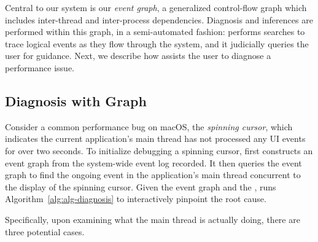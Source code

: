 Central to our system is our \emph{event graph}, a generalized control-flow
graph which includes inter-thread and inter-process dependencies. Diagnosis
and inferences are performed within this graph, in a semi-automated fashion:
\xxx performs searches to trace logical events as they
flow through the system, and it judicially queries the user for guidance.
Next, we describe how \xxx assists the user to diagnose a performance issue.


\subsection{Diagnosis with Graph}\label{subsec:debug}



Consider a common performance bug on macOS, the \emph{spinning cursor},
which indicates the current application's main thread has not processed
any UI events for over two seconds.  To initialize debugging a spinning
cursor, \xxx first constructs an event graph from the system-wide event
log recorded.  It then queries the event graph to find the ongoing event
in the application's main thread concurrent to the display of the spinning
cursor.  Given the event graph and the \spinningnode, \xxx runs
Algorithm~\ref{alg:alg-diagnosis} to interactively pinpoint the root
cause.

Specifically, upon examining what the main thread is actually doing, there
are three potential cases.

